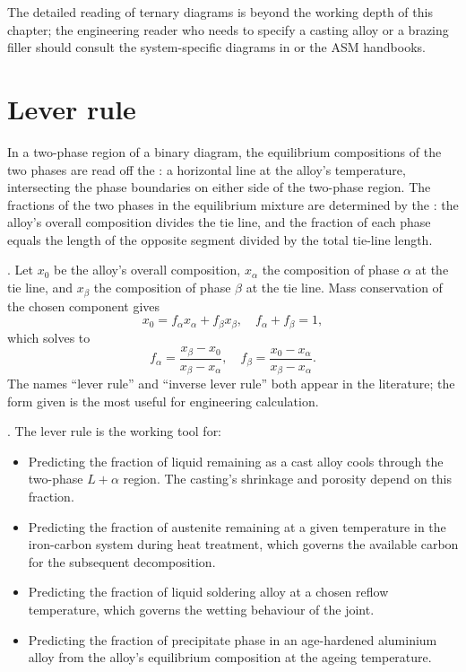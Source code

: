 The detailed reading of ternary diagrams is beyond the working depth
of this chapter; the engineering reader who needs to specify a casting
alloy or a brazing filler should consult the system-specific diagrams
in \textcite{text:porter-easterling-phase} or the ASM handbooks.

\section{Lever rule}

In a two-phase region of a binary diagram, the equilibrium compositions
of the two phases are read off the : a horizontal
line at the alloy's temperature, intersecting the phase boundaries on
either side of the two-phase region. The fractions of the two phases
in the equilibrium mixture are determined by the :
the alloy's overall composition divides the tie line, and the fraction
of each phase equals the length of the opposite segment divided by the
total tie-line length.

. Let $x_0$ be the alloy's overall
composition, $x_\alpha$ the composition of phase $\alpha$ at the tie
line, and $x_\beta$ the composition of phase $\beta$ at the tie line.
Mass conservation of the chosen component gives
\[
x_0 = f_\alpha x_\alpha + f_\beta x_\beta, \quad f_\alpha + f_\beta = 1,
\]
which solves to
\[
f_\alpha = \frac{x_\beta - x_0}{x_\beta - x_\alpha}, \quad f_\beta =
\frac{x_0 - x_\alpha}{x_\beta - x_\alpha}.
\]
The names ``lever rule'' and ``inverse lever rule'' both appear in the
literature; the form given is the most useful for engineering
calculation.

. The lever rule is the working tool for:

\begin{itemize}[leftmargin=*]
\item Predicting the fraction of liquid remaining as a cast alloy
  cools through the two-phase $L + \alpha$ region. The casting's
  shrinkage and porosity depend on this fraction.
\item Predicting the fraction of austenite remaining at a given
  temperature in the iron-carbon system during heat treatment, which
  governs the available carbon for the subsequent decomposition.
\item Predicting the fraction of liquid soldering alloy at a chosen
  reflow temperature, which governs the wetting behaviour of the
  joint.
\item Predicting the fraction of precipitate phase in an age-hardened
  aluminium alloy from the alloy's equilibrium composition at the
  ageing temperature.
\end{itemize}

